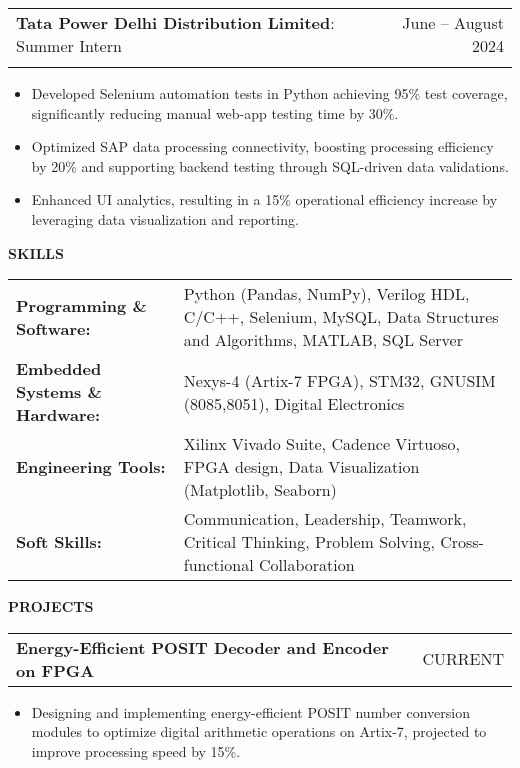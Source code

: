 \documentclass[a4paper]{article}
\begin{document}
\vspace{0.4em}
\begin{tabularx}{\textwidth}{@{}X r@{}}
    \textbf{Tata Power Delhi Distribution Limited}: Summer Intern & June -- August 2024 \\
    \textit{} &
\end{tabularx}
\vspace{-0.2em}
\begin{itemize}
    \item Developed Selenium automation tests in Python achieving 95\% test coverage, significantly reducing manual web-app testing time by 30\%.
    \item Optimized SAP data processing connectivity, boosting processing efficiency by 20\% and supporting backend testing through SQL-driven data validations.
    \item Enhanced UI analytics, resulting in a 15\% operational efficiency increase by leveraging data visualization and reporting.
\end{itemize}

\begin{sectionbox}\textbf{SKILLS}\end{sectionbox}
\vspace{0em}
\begin{tabularx}{\textwidth}{@{}>{\bfseries}l X@{}}
    Programming \& Software: & Python (Pandas, NumPy), Verilog HDL, C/C++, Selenium, MySQL, Data Structures and Algorithms, MATLAB, SQL Server \\
    Embedded Systems \& Hardware: & Nexys-4 (Artix-7 FPGA), STM32, GNUSIM (8085,8051), Digital Electronics \\
    Engineering Tools: & Xilinx Vivado Suite, Cadence Virtuoso, FPGA design, Data Visualization (Matplotlib, Seaborn) \\
    Soft Skills: & Communication, Leadership, Teamwork, Critical Thinking, Problem Solving, Cross-functional Collaboration \\
\end{tabularx}

\begin{sectionbox}\textbf{PROJECTS}\end{sectionbox}
\vspace{0em}
\begin{tabularx}{\textwidth}{@{}X r@{}}
    \textbf{Energy-Efficient POSIT Decoder and Encoder on FPGA} & CURRENT \\
\end{tabularx}
\vspace{-0.2em}
\begin{itemize}
    \item Designing and implementing energy-efficient POSIT number conversion modules to optimize digital arithmetic operations on Artix-7, projected to improve processing speed by 15\%.
\end{itemize}
\end{document}
